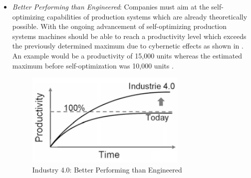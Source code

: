 \begin{itemize}
\item \textit{Better Performing than Engineered}: Companies must aim at the self-optimizing	capabilities of production systems which are already theoretically possible. With the ongoing advancement of self-optimizing production systems machines should be able to reach a productivity level which exceeds the previously determined maximum due to cybernetic effects as shown in . An example would be a productivity of 15,000 units whereas the estimated maximum before self-optimization was 10,000 units \cite{IN4HYPO}.
\begin{figure}[h!]
\includegraphics[scale=0.5]{./gfx/revengg}
\centering
\caption{Industry 4.0: Better Performing than Engineered \cite{IN4HYPO}}
\label{fig:2.5}
\end{figure}
\end{itemize}
